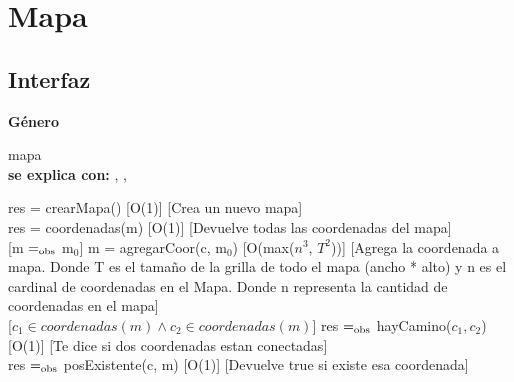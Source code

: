
\section{Mapa}


\subsection{Interfaz}

\parbox {1,7cm}{{\bf Género}} mapa\\
{\bf se explica con:}  , , \\
\medskip

{res = crearMapa()}
[O(1)]
[Crea un nuevo mapa]
\\

{res = coordenadas(m)}
[O(1)]
[Devuelve todas las coordenadas del mapa]
\\

[m $=_{\mathrm{obs}}$ m$_0$]
{m = agregarCoor(c, m$_0$)}
[O(max($n^3$, $T^2$))]
[Agrega la coordenada a mapa. Donde T es el tama\~no de la grilla de todo el mapa (ancho * alto) y n es el cardinal de coordenadas en el Mapa. Donde n representa la cantidad de coordenadas en el mapa]
\\

[$c_1 \in coordenadas(m) \wedge c_2 \in coordenadas(m)$]
{res $=_{\mathrm{obs}}$ hayCamino($c_1, c_2$)}
[O(1)]
[Te dice si dos coordenadas estan conectadas]
\\


{res $=_{\mathrm{obs}}$ posExistente(c, m)}
[O(1)]
[Devuelve true si existe esa coordenada]
\\

